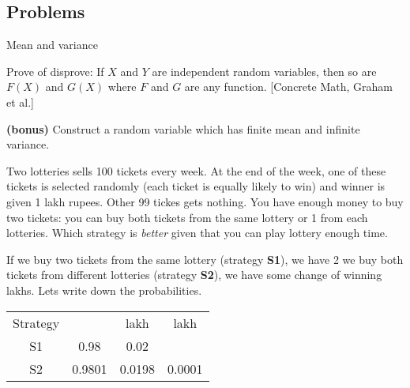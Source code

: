 \documentclass[a4paper,9pt, addpoints, solutions]{exam}
\newcommand\MEAN[1]{\langle #1\rangle}
\newcommand\VAR[1]{\text{Var}(#1)}
\newcommand\BONUS{\textbf{(bonus)} }
\begin{document}
\subsection*{Problems}
\begin{questions}

    \question Mean and variance

\question[5] Prove of disprove: If $X$ and $Y$ are independent random variables,
then so are $F(X)$ and $G(X)$ where $F$ and $G$ are any function. [Concrete
Math, Graham et al.]

\question[3] \BONUS Construct a random variable which has finite mean and infinite
variance.

\question[10]
Two lotteries sells 100 tickets every week. At the end of the week, one of these
tickets is selected randomly (each ticket is equally likely to win) and winner
is given 1 lakh rupees. Other 99 tickes gets nothing. You have enough money to
buy two tickets: you can buy both tickets from the same lottery or 1 from each
lotteries. Which strategy is \textit{better} given that you can play lottery enough
time.

\begin{solution} 
    If we buy two tickets from the same lottery (strategy \textbf{S1}), we have
    2%
    we buy both tickets from different lotteries (strategy \textbf{S2}), we have
    some change of winning  lakhs. Lets write down the probabilities.

    \begin{tabular}{c c c c}
        Strategy                    & \rupee 0     & \rupee 1 lakh & \rupee 2 lakh \\
        S1                          & 0.98         & 0.02          & \\
        S2                          & 0.9801       & 0.0198        & 0.0001 \\
    \end{tabular}


\end{solution}
\end{questions}
\end{document}
